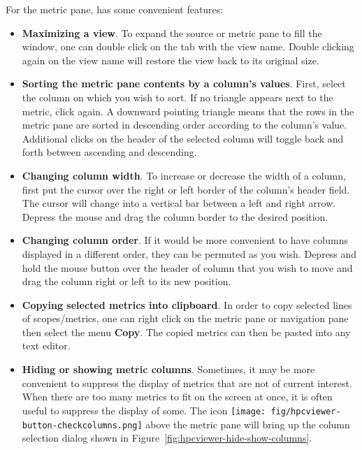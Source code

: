 For the metric pane, \hpcviewer{} has some convenient features:
\begin{itemize}

\item \textbf{Maximizing a view}.
  To expand the source or metric pane to fill the window, one can double click on the tab with the view name.
  Double clicking again on the view name will restore the view back to its original size.

\item \textbf{Sorting the metric pane contents by a column's values}.
  First, select the column on which you wish to sort.
  If no triangle appears next to the metric, click again.
  A downward pointing triangle means that the rows in the metric pane are sorted in descending order according to the column's value.
  Additional clicks on the header of the selected column will toggle back and forth between ascending and descending.

\item \textbf{Changing column width}.
  To increase or decrease the width of a column, first put the cursor over the right or left border of the column's header field.
  The cursor will change into a vertical bar between a left and right arrow.
  Depress the mouse and drag the column border to the desired position.

\item \textbf{Changing column order}.
  If it would be more convenient to have columns displayed in a different order, they can be permuted as you wish.
  Depress and hold the mouse button over the header of column that you wish to move and drag the column right or left to its new position.

\item \textbf{Copying selected metrics into clipboard}.
  In order to copy selected lines of scopes/metrics, one can right click on the metric pane or navigation pane then select the menu \textbf{Copy}.
  The copied metrics can then be pasted into any text editor.

\item \textbf{Hiding or showing metric columns}.
  Sometimes, it may be more convenient to suppress the display of metrics that are not of current interest.
  When there are too many metrics to fit on the screen at once, it is often useful to suppress the display of some.
  The icon \texttt{[image: fig/hpcviewer-button-checkcolumns.png]} above the metric pane will bring up the column selection dialog shown in Figure~\ref{fig:hpcviewer-hide-show-columns}.


\end{itemize}
